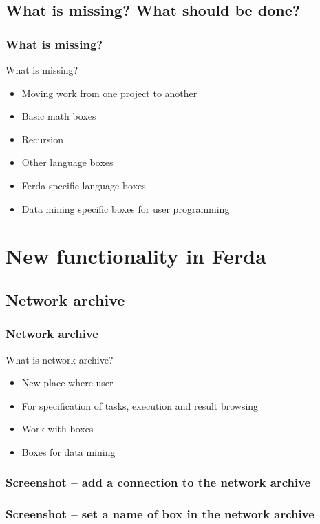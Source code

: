 \documentclass{beamer}
\begin{document}
\subsection{What is missing? What should be done?}
\begin{frame}
	\frametitle{What is missing?}
	\begin{block}{What is missing?}
		\begin{itemize}[<+->]
			\item Moving work from one project to another
			\item Basic math boxes
			\item Recursion
			\item Other language boxes
			\item Ferda specific language boxes
			\item Data mining specific boxes for user programming
		\end{itemize}
	\end{block}	
\end{frame}


\section{New functionality in Ferda}
\subsection{Network archive}
\begin{frame}
	\frametitle{Network archive}
	\begin{block}{What is network archive?}
		\begin{itemize}[<+->]
			\item New place where user
			\item For specification of tasks, execution and result browsing
			\item Work with boxes
			\item Boxes for data mining
		\end{itemize}
	\end{block}
	
\end{frame}

\begin{frame}
	\frametitle{Screenshot -- add a connection to the network archive}
\end{frame}

\begin{frame}
	\frametitle{Screenshot -- set a name of box in the network archive}
\end{frame}
\end{document}
